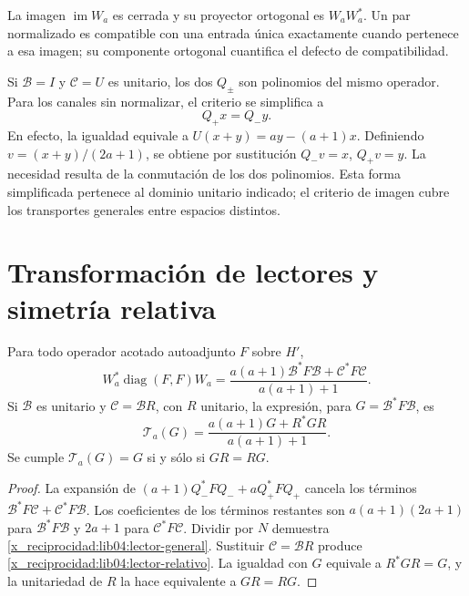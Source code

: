 La imagen \(\operatorname{im}W_a\) es cerrada y su proyector
ortogonal es \(W_aW_a^*\). Un par normalizado es compatible con una
entrada única exactamente cuando pertenece a esa imagen; su componente
ortogonal cuantifica el defecto de compatibilidad.

Si \(\mathcal B=I\) y \(\mathcal C=U\) es unitario, los dos
\(Q_\pm\) son polinomios del mismo operador. Para los canales sin
normalizar, el criterio se simplifica a
\begin{equation}
 Q_+x=Q_-y.
 \label{x_reciprocidad:lib04:compatibilidad-unitaria}
\end{equation}
En efecto, la igualdad equivale a
\(U(x+y)=ay-(a+1)x\). Definiendo
\(v=(x+y)/(2a+1)\), se obtiene por sustitución
\(Q_-v=x\), \(Q_+v=y\). La necesidad resulta de la conmutación
de los dos polinomios. Esta forma simplificada pertenece al dominio
unitario indicado; el criterio de imagen cubre los transportes
generales entre espacios distintos.

\section{Transformación de lectores y simetría relativa}
\label{x_reciprocidad:lib04:lectores}

\begin{theorem}
\label{x_reciprocidad:lib04:teo-lector}
Para todo operador acotado autoadjunto \(F\) sobre \(H'\),
\begin{equation}
 W_a^*\operatorname{diag}(F,F)W_a
 =\frac{a(a+1)\mathcal B^*F\mathcal B+
                  \mathcal C^*F\mathcal C}{a(a+1)+1}.
 \label{x_reciprocidad:lib04:lector-general}
\end{equation}
Si \(\mathcal B\) es unitario y \(\mathcal C=\mathcal BR\), con
\(R\) unitario, la expresión, para \(G=\mathcal B^*F\mathcal B\),
es
\begin{equation}
 \mathcal T_a(G)=\frac{a(a+1)G+R^*GR}{a(a+1)+1}.
 \label{x_reciprocidad:lib04:lector-relativo}
\end{equation}
Se cumple \(\mathcal T_a(G)=G\) si y sólo si \(GR=RG\).
\end{theorem}

\begin{proof}
La expansión de \((a+1)Q_-^*FQ_-+aQ_+^*FQ_+\) cancela los
términos \(\mathcal B^*F\mathcal C+\mathcal C^*F\mathcal B\).
Los coeficientes de los términos restantes son
\(a(a+1)(2a+1)\) para \(\mathcal B^*F\mathcal B\) y \(2a+1\)
para \(\mathcal C^*F\mathcal C\). Dividir por \(N\) demuestra
\eqref{x_reciprocidad:lib04:lector-general}. Sustituir \(\mathcal C=\mathcal BR\)
produce \eqref{x_reciprocidad:lib04:lector-relativo}. La igualdad con \(G\) equivale
a \(R^*GR=G\), y la unitariedad de \(R\) la hace equivalente a
\(GR=RG\).
\end{proof}

